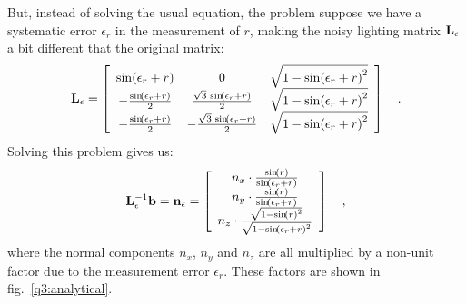 \documentclass{report}
\begin{document}
But, instead of solving the usual equation, the problem suppose we have a systematic error $\epsilon_r$ in the measurement of $r$, making the noisy lighting matrix $\mathbf{L}_\epsilon$ a bit different that the original matrix:
\begin{equation}
\B{L}_\epsilon = \left[\begin{array}{ccc} \sin\!\left(\epsilon_r + r\right) & 0 & \sqrt{1 - {\sin\!\left(\epsilon_r + r\right)}^2}\\ -\frac{\sin\!\left(\epsilon_r + r\right)}{2} & \frac{\sqrt{3}\, \sin\!\left(\epsilon_r + r\right)}{2} & \sqrt{1 - {\sin\!\left(\epsilon_r + r\right)}^2}\\ -\frac{\sin\!\left(\epsilon_r + r\right)}{2} & -\frac{\sqrt{3}\, \sin\!\left(\epsilon_r + r\right)}{2} & \sqrt{1 - {\sin\!\left(\epsilon_r + r\right)}^2} \end{array}\right]
\quad.
\end{equation}
Solving this problem gives us:
\begin{equation}
\mathbf{L}_\epsilon^{-1}\mathbf{b} = \mathbf{n}_\epsilon = 
\left[\begin{array}{c} n_x \cdot \frac{\sin\!\left(r\right)}{\sin\!\left(\epsilon_r + r\right)}\\ n_y \cdot \frac{\sin\!\left(r\right)}{\sin\!\left(\epsilon_r + r\right)}\\ n_z \cdot \frac{\sqrt{1 - {\sin\!\left(r\right)}^2}}{\sqrt{1 - {\sin\!\left(\epsilon_r + r\right)}^2}} \end{array}\right]
\quad,
\end{equation}
where the normal components $n_x$, $n_y$ and $n_z$ are all multiplied by a non-unit factor due to the measurement error $\epsilon_r$. These factors are shown in fig.~\ref{q3:analytical}.
\end{document}
